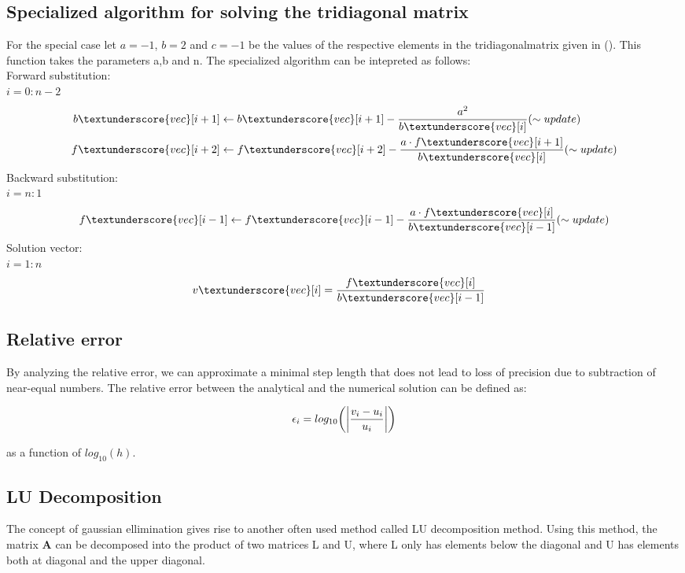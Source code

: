 \documentclass{article}
\begin{document}
\subsection{Specialized algorithm for solving the tridiagonal matrix}
For the special case let $a = -1$, $b = 2$ and $c = -1$ be the values of the respective elements in the tridiagonalmatrix given in (). This function takes the parameters a,b and n. The specialized algorithm can be intepreted as follows: \\
Forward substitution:\\
$i=0:n-2$
\begin{align*}
b\textunderscore{vec}[i+1] & \leftarrow b\textunderscore{vec}[i+1]  - \frac{a^2}{b\textunderscore{vec}[i]}     (\sim update)\\
f\textunderscore{vec}[i+2] &\leftarrow f\textunderscore{vec}[i+2]  - \frac{a \cdot f\textunderscore{vec}[i+1]}{b\textunderscore{vec}[i]}      (\sim update)\\
\end{align*}
Backward substitution: \\
$i = n:1 $
\begin{align*}
f\textunderscore{vec}[i-1] & \leftarrow f\textunderscore{vec}[i-1] - \frac{a \cdot f\textunderscore{vec}[i]}{b\textunderscore{vec}[i-1]}      (\sim update)\\
\end{align*}
Solution vector:\\
$i =1:n$
\begin{align*}
v\textunderscore{vec}[i] & = \frac{f\textunderscore{vec}[i]}{b\textunderscore{vec}[i-1]}
\end{align*}

\subsection{Relative error}

By analyzing the relative error, we can approximate a minimal step length that does not lead to loss of precision due to subtraction of near-equal numbers. The relative error between the analytical and the numerical solution can be defined as:

\begin{equation}
	\epsilon_{i} = log_{10}\bigg(\abs{\frac{v_i-u_i}{u_i}}\bigg)
	\label{eq:8}
\end{equation}

as a function of $log_{10}(h)$.

\subsection{LU Decomposition}
The concept of gaussian ellimination gives rise to another often used method called LU decomposition method. Using this method, the matrix $\textbf{A}$ can be decomposed into the product of two matrices L and U, where L only has elements below the diagonal and U has elements  both at diagonal and the upper diagonal.
\end{document}
